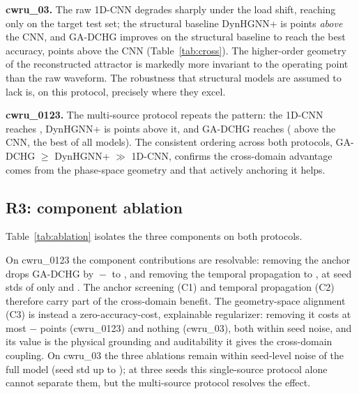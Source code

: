 \textbf{cwru\_03.} The raw 1D-CNN degrades sharply under the load shift, reaching
only \AccCZeroThreeCnn{} on the target test set; the structural baseline
DynHGNN+ is \GapCZeroThreeDynhg{} points \emph{above} the CNN, and GA-DCHG
improves on the structural baseline to reach the best accuracy,
\GapCZeroThreeGad{} points above the CNN (Table~\ref{tab:cross}). The
higher-order geometry of the reconstructed attractor is markedly more invariant
to the operating point than the raw waveform. The robustness that structural
models are assumed to lack is, on this protocol, precisely where they excel.

\textbf{cwru\_0123.} The multi-source protocol repeats the pattern: the 1D-CNN
reaches \AccCZeroOneTwoThreeCnn{}, DynHGNN+ is
\GapCZeroOneTwoThreeDynhg{} points above it, and GA-DCHG reaches
\AccCZeroOneTwoThreeGad{} (\GapCZeroOneTwoThreeGad{} above the CNN, the best of
all models). The consistent ordering across both protocols, GA-DCHG $\geq$
DynHGNN+ $\gg$ 1D-CNN, confirms the cross-domain advantage comes from the
phase-space geometry and that actively anchoring it helps.

\subsection{R3: component ablation}
\label{sec:r3}

Table~\ref{tab:ablation} isolates the three components on both protocols.

\begin{table}[t]
  \centering
  \small
  \caption{Component ablation: target-test accuracy and the change ($\Delta$)
  relative to the full GA-DCHG.}
  \label{tab:ablation}
  
\end{table}

On cwru\_0123 the component contributions are resolvable: removing the anchor
drops GA-DCHG by \XAccCZeroOneTwoThreeGad{}${}-{}$\XAccCZeroOneTwoThreeAnchor{}
to \XAccCZeroOneTwoThreeAnchor{}, and removing the temporal propagation to
\XAccCZeroOneTwoThreeTemp{}, at seed stds of only \XSdCZeroOneTwoThreeAnchor{} and
\XSdCZeroOneTwoThreeTemp{}. The anchor screening (C1) and temporal
propagation (C2) therefore carry part of the cross-domain benefit. The geometry-space
alignment (C3) is instead a zero-accuracy-cost, explainable regularizer:
removing it costs at most
\XAccCZeroOneTwoThreeGad{}$-{}$\XAccCZeroOneTwoThreeAlign{} points (cwru\_0123)
and nothing (cwru\_03), both within seed noise, and its value is the physical
grounding and auditability it gives the cross-domain coupling. On cwru\_03
the three ablations remain within seed-level noise of the full model (seed std up
to \SdMaxCZeroThree{}); at three seeds this single-source protocol alone cannot
separate them, but the multi-source protocol resolves the effect.

